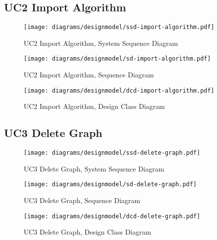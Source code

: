 \subsection{UC2 Import Algorithm}
\begin{figure}[H]
    \centering
    \texttt{[image: diagrams/designmodel/ssd-import-algorithm.pdf]}
    \caption{UC2 Import Algorithm, System Sequence Diagram}
    \label{fig:import-algorithm-ssd}
\end{figure}
\begin{figure}[H]
    \centering
    \texttt{[image: diagrams/designmodel/sd-import-algorithm.pdf]}
    \caption{UC2 Import Algorithm, Sequence Diagram}
    \label{fig:import-algorithm-sd}
\end{figure}
\begin{figure}[H]
    \centering
    \texttt{[image: diagrams/designmodel/dcd-import-algorithm.pdf]}
    \caption{UC2 Import Algorithm, Design Class Diagram}
    \label{fig:import-algorithm-dcd}
\end{figure}
% 
\subsection{UC3 Delete Graph}
\begin{figure}[H]
    \centering
    \texttt{[image: diagrams/designmodel/ssd-delete-graph.pdf]}
    \caption{UC3 Delete Graph, System Sequence Diagram}
    \label{fig:delete-graph-ssd}
\end{figure}
\begin{figure}[H]
    \centering
    \texttt{[image: diagrams/designmodel/sd-delete-graph.pdf]}
    \caption{UC3 Delete Graph, Sequence Diagram}
    \label{fig:delete-graph-sd}
\end{figure}
\begin{figure}[H]
    \centering
    \texttt{[image: diagrams/designmodel/dcd-delete-graph.pdf]}
    \caption{UC3 Delete Graph, Design Class Diagram}
    \label{fig:delete-graph-dcd}
\end{figure}
% 
